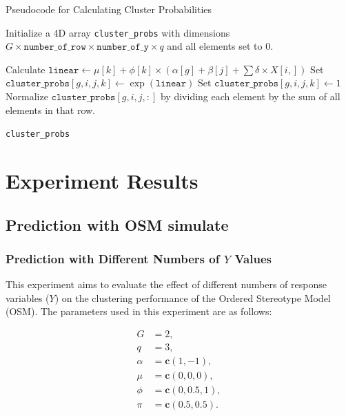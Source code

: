 \documentclass{article}
\begin{document}
\begin{algorithm}
  \caption{Pseudocode for Calculating Cluster Probabilities}
  \label{fig:algo}
  \begin{algorithmic}[1]
  \STATE Initialize a 4D array \texttt{cluster\_probs} with dimensions $G \times \texttt{number\_of\_row} \times \texttt{number\_of\_y} \times q$ and all elements set to 0.
  
                      \STATE Calculate $\texttt{linear} \gets \mu[k] + \phi[k] \times (\alpha[g] + \beta[j] + \sum \delta \times X[i,])$
                      \STATE Set $\texttt{cluster\_probs}[g, i, j, k] \gets \exp(\texttt{linear})$
                  \ELSE
                      \STATE Set $\texttt{cluster\_probs}[g, i, j, k] \gets 1$
                  \ENDIF
              \ENDFOR
              \STATE Normalize $\texttt{cluster\_probs}[g, i, j, :]$ by dividing each element by the sum of all elements in that row.
          \ENDFOR
      \ENDFOR
  \ENDFOR
  
  \RETURN \texttt{cluster\_probs}
  \end{algorithmic}
\end{algorithm}



\section{Experiment Results}

\subsection{Prediction with OSM simulate}

\subsubsection*{Prediction with Different Numbers of \( Y \) Values}

This experiment aims to evaluate the effect of different numbers of response variables (\( Y \)) on the clustering performance of the Ordered Stereotype Model (OSM). The parameters used in this experiment are as follows:

\[
\begin{aligned}
G &= 2, \\
q &= 3, \\
\alpha &= \mathbf{c}(1, -1), \\
\mu &= \mathbf{c}(0, 0, 0), \\
\phi &= \mathbf{c}(0, 0.5, 1), \\
\pi &= \mathbf{c}(0.5, 0.5).
\end{aligned}
\]
\end{document}
